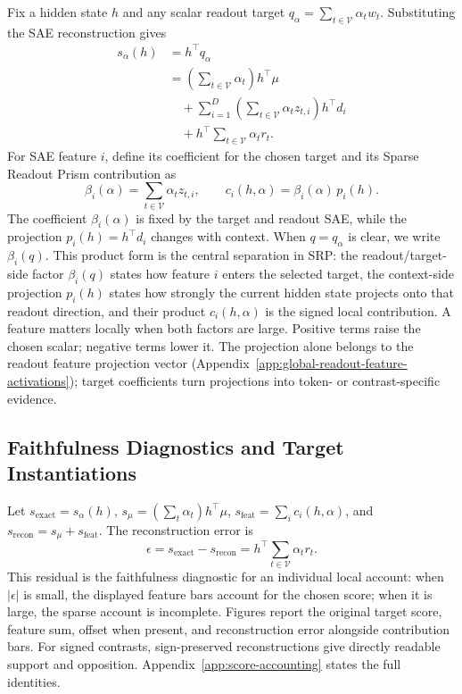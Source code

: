 Fix a hidden state \(h\) and any scalar readout target
\(q_\alpha=\sum_{t\in\mathcal{V}}\alpha_t w_t\). Substituting the SAE
reconstruction gives
\[
\begin{aligned}
    s_\alpha(h)
    &= h^\top q_\alpha \\
    &=
    \left(\sum_{t\in\mathcal{V}} \alpha_t\right) h^\top\mu \\
    &\quad + \sum_{i=1}^{D}
        \left(\sum_{t\in\mathcal{V}} \alpha_t z_{t,i}\right) h^\top d_i \\
    &\quad + h^\top \sum_{t\in\mathcal{V}} \alpha_t r_t .
\end{aligned}
\]
For SAE feature \(i\), define its coefficient for the chosen target and its
Sparse Readout Prism contribution as
\[
    \beta_i(\alpha)=\sum_{t\in\mathcal{V}} \alpha_t z_{t,i},
    \qquad
    c_i(h,\alpha)=\beta_i(\alpha)\,p_i(h).
\]
The coefficient \(\beta_i(\alpha)\) is fixed by the target and readout SAE, while
the projection \(p_i(h)=h^\top d_i\) changes with context. When
\(q=q_\alpha\) is clear, we write \(\beta_i(q)\). This product form is the
central separation in SRP: the readout/target-side factor \(\beta_i(q)\) states
how feature \(i\) enters the selected target, the context-side projection
\(p_i(h)\) states how strongly the current hidden state projects onto that
readout direction, and their product \(c_i(h,\alpha)\) is the signed local
contribution. A feature matters locally when both factors are large. Positive
terms raise the chosen scalar; negative terms lower it. The projection alone
belongs to the readout feature projection vector
(Appendix~\ref{app:global-readout-feature-activations}); target coefficients
turn projections into token- or contrast-specific evidence.

\subsection{Faithfulness Diagnostics and Target Instantiations}
\label{sec:method-faithfulness}

Let \(s_{\mathrm{exact}}=s_\alpha(h)\),
\(s_\mu=(\sum_t\alpha_t)h^\top\mu\),
\(s_{\mathrm{feat}}=\sum_i c_i(h,\alpha)\), and
\(s_{\mathrm{recon}}=s_\mu+s_{\mathrm{feat}}\). The reconstruction error is
\[
    \epsilon
    =
    s_{\mathrm{exact}}-s_{\mathrm{recon}}
    =
    h^\top\sum_{t\in\mathcal{V}}\alpha_t r_t .
\]
This residual is the faithfulness diagnostic for an individual local account:
when \(|\epsilon|\) is small, the displayed feature bars account for the chosen
score; when it is large, the sparse account is incomplete. Figures report the
original target score, feature sum, offset when present, and reconstruction
error alongside contribution bars. For signed contrasts, sign-preserved
reconstructions give directly readable support and opposition.
Appendix~\ref{app:score-accounting} states the full identities.

